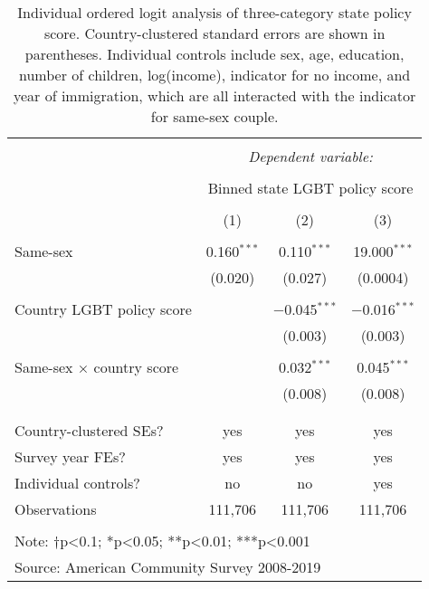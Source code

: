 \documentclass[
  11pt,
]{article}
\begin{document}
\begin{table}[!htbp] \centering 
  \caption{Individual ordered logit analysis of three-category state policy score. Country-clustered standard errors are shown in parentheses. Individual controls include sex, age, education, number of children, log(income), indicator for no income, and year of immigration, which are all interacted with the indicator for same-sex couple.} 
  \label{tab:ord} 
\begin{tabular}{@{\extracolsep{5pt}}lccc} 
\\[-1.8ex]\hline 
\hline \\[-1.8ex] 
 & \multicolumn{3}{c}{\textit{Dependent variable:}} \\ 
\cline{2-4} 
\\[-1.8ex] & \multicolumn{3}{c}{Binned state LGBT policy score} \\ 
\\[-1.8ex] & (1) & (2) & (3)\\ 
\hline \\[-1.8ex] 
 Same-sex & 0.160$^{***}$ & 0.110$^{***}$ & 19.000$^{***}$ \\ 
  & (0.020) & (0.027) & (0.0004) \\ 
  & & & \\ 
 Country LGBT policy score &  & $-$0.045$^{***}$ & $-$0.016$^{***}$ \\ 
  &  & (0.003) & (0.003) \\ 
  & & & \\ 
 Same-sex × country score &  & 0.032$^{***}$ & 0.045$^{***}$ \\ 
  &  & (0.008) & (0.008) \\ 
  & & & \\ 
\hline \\[-1.8ex] 
Country-clustered SEs? & yes & yes & yes \\ 
Survey year FEs? & yes & yes & yes \\ 
Individual controls? & no & no & yes \\ 
Observations & 111,706 & 111,706 & 111,706 \\ 
\hline 
\hline \\[-1.8ex] 
\multicolumn{4}{l}{Note: †p<0.1; *p<0.05; **p<0.01; ***p<0.001} \\ 
\multicolumn{4}{l}{Source: American Community Survey 2008-2019} \\ 
\end{tabular} 
\end{table}
\end{document}
